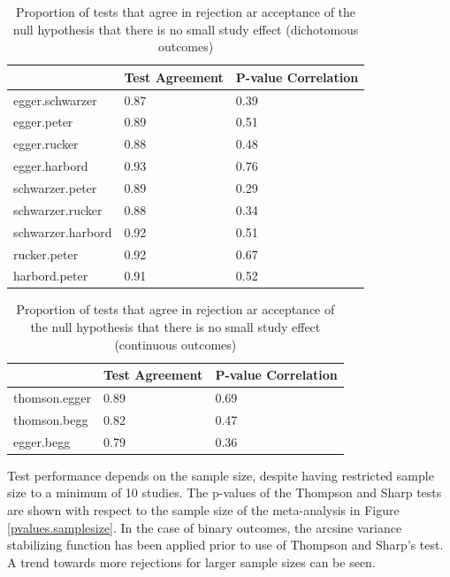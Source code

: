\documentclass[11pt,a4paper,twoside]{book}\usepackage[]{graphicx}\usepackage[]{color}
\begin{document}
\begin{table}[ht]
\centering
\begingroup\footnotesize
\begin{tabular}{lll}
  \hline
 & Test Agreement & P-value Correlation \\ 
  \hline
egger.schwarzer & 0.87 & 0.39 \\ 
  egger.peter & 0.89 & 0.51 \\ 
  egger.rucker & 0.88 & 0.48 \\ 
  egger.harbord & 0.93 & 0.76 \\ 
  schwarzer.peter & 0.89 & 0.29 \\ 
  schwarzer.rucker & 0.88 & 0.34 \\ 
  schwarzer.harbord & 0.92 & 0.51 \\ 
  rucker.peter & 0.92 & 0.67 \\ 
  harbord.peter & 0.91 & 0.52 \\ 
   \hline
\end{tabular}
\endgroup
\caption{Proportion of tests that agree in rejection ar acceptance of the null hypothesis that there is no small study effect (dichotomous outcomes)} 
\label{agreement.bin}
\end{table}



\begin{table}[ht]
\centering
\begingroup\footnotesize
\begin{tabular}{lll}
  \hline
 & Test Agreement & P-value Correlation \\ 
  \hline
thomson.egger & 0.89 & 0.69 \\ 
  thomson.begg & 0.82 & 0.47 \\ 
  egger.begg & 0.79 & 0.36 \\ 
   \hline
\end{tabular}
\endgroup
\caption{Proportion of tests that agree in rejection ar acceptance of the null hypothesis that there is no small study effect (continuous outcomes)} 
\label{agreement.cont}
\end{table}


\vspace{0mm}
Test performance depends on the sample size, despite having restricted sample size to a minimum of 10 studies. The p-values of the Thompson and Sharp tests are shown with respect to the sample size of the meta-analysis in Figure \ref{pvalues.samplesize}. %
In the case of binary outcomes, the arcsine variance stabilizing function has been applied prior to use of Thompson and Sharp's test. A trend towards more rejections for larger sample sizes can be seen.
\end{document}
